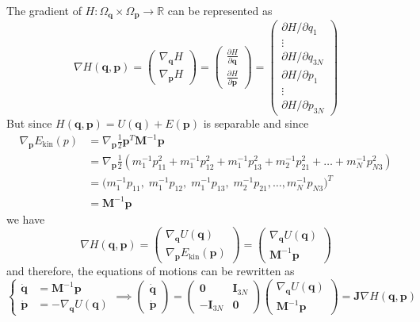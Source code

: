 \documentclass{article}
\theoremstyle{remark}
\theoremstyle{definition}
\begin{document}
The gradient of $H: \Omega_\mathbf{q} \times \Omega_\mathbf{p} \longrightarrow \mathbb{R}$ can be represented as 
\[\nabla H(\mathbf{q}, \mathbf{p}) = 
\begin{pmatrix} \nabla_\mathbf{q} H \\[1mm] \nabla_\mathbf{p} H \end{pmatrix} =
\begin{pmatrix} \frac{\partial H}{\partial \mathbf{q}} \\[2mm] \frac{\partial H}{\partial \mathbf{p}} \end{pmatrix} = 
\begin{pmatrix} \partial H / \partial q_1 \\ \vdots \\ \partial H / \partial q_{3N} \\ \partial H / \partial p_1 \\ \vdots \\ \partial H / \partial p_{3N} \end{pmatrix} \]
But since $H(\mathbf{q}, \mathbf{p}) = U(\mathbf{q}) + E (\mathbf{p})$ is separable and since 
\begin{align*}
    \nabla_\mathbf{p} E_\mathrm{kin}(p) & = \nabla_\mathbf{p} \frac{1}{2} \mathbf{p}^T \mathbf{M}^{-1} \mathbf{p} \\
    & = \nabla_\mathbf{p} \frac{1}{2} (m_1^{-1} p_{11}^2 + m_1^{-1} p_{12}^2 + m_1^{-1} p_{13}^2 + m_2^{-1} p_{21}^2 + \ldots + m_N^{-1} p_{N3}^2) \\
    & = \big(m_1^{-1} p_{11}, \;m_1^{-1} p_{12}, \;m_1^{-1} p_{13}, \;m_2^{-1} p_{21}, \ldots, m_N^{-1} p_{N3} \big)^T \\
    & = \mathbf{M}^{-1} \mathbf{p} 
\end{align*}
we have 
\[\nabla H(\mathbf{q}, \mathbf{p}) = \begin{pmatrix} \nabla_\mathbf{q} U (\mathbf{q})\\ \nabla_\mathbf{p} E_\mathrm{kin} (\mathbf{p}) \end{pmatrix} = \begin{pmatrix} \nabla_\mathbf{q} U (\mathbf{q})\\ \mathbf{M}^{-1} \mathbf{p} \end{pmatrix} \]
and therefore, the equations of motions can be rewritten as 
\[\begin{cases} \boldsymbol{\dot{q}} & = \mathbf{M}^{-1} \mathbf{p} \\
\boldsymbol{\dot{p}} & = - \nabla_\mathbf{q} U(\mathbf{q}) \end{cases} \implies \begin{pmatrix} \boldsymbol{\dot{q}} \\ \boldsymbol{\dot{p}} \end{pmatrix} = \begin{pmatrix} \mathbf{0} & \mathbf{I}_{3N} \\ -\mathbf{I}_{3N} & \mathbf{0} \end{pmatrix} \begin{pmatrix} \nabla_\mathbf{q} U (\mathbf{q})\\ \mathbf{M}^{-1} \mathbf{p} \end{pmatrix} = \mathbf{J} \nabla H(\mathbf{q}, \mathbf{p})\]
\end{document}
